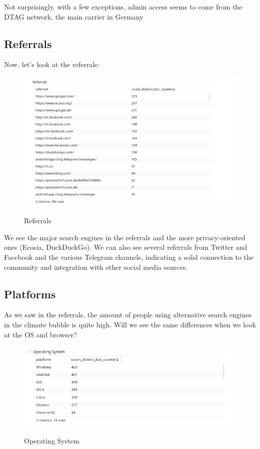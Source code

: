 Not surprisingly, with a few exceptions, admin access seems to come from the DTAG network, the main carrier in Germany

\subsection{Referrals}

Now, let's look at the referrals:

\begin{figure}[H]
\centering
\caption {Referrals}
\includegraphics[width=\linewidth]{images/figure07.png}
\label{fig:referrals}
\end{figure}

We see the major search engines in the referrals and the more privacy-oriented ones (Ecosia, DuckDuckGo). We can also see several referrals from Twitter and Facebook and the various Telegram channels, indicating a solid connection to the community and integration with other social media sources.

\subsection{Platforms}

As we saw in the referrals, the amount of people using alternative search engines in the climate bubble is quite high. Will we see the same differences when we look at the OS and browser?

\begin{figure}[H]
\centering
\caption {Operating System}
\includegraphics[width=\linewidth]{images/figure08.png}
\label{fig:operatingSystem}
\end{figure}

